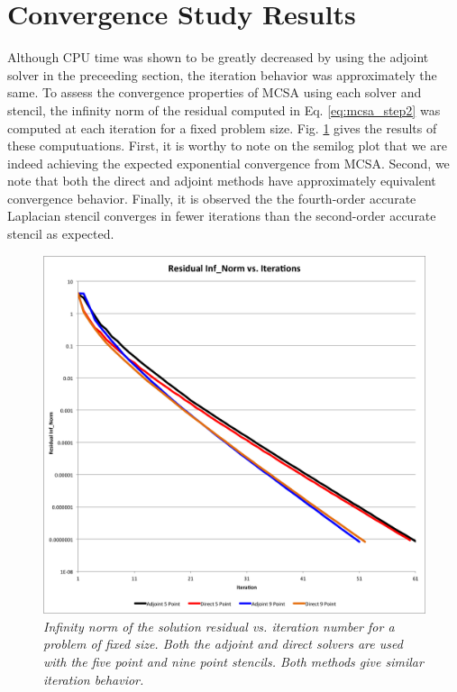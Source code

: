 \documentclass[note]{TechNote}
\begin{document}
\section{Convergence Study Results}
Although CPU time was shown to be greatly decreased by using the
adjoint solver in the preceeding section, the iteration behavior was
approximately the same. To assess the convergence properties of MCSA
using each solver and stencil, the infinity norm of the residual
computed in Eq. \ref{eq:mcsa_step2} was computed at each iteration for
a fixed problem size. Fig. \ref{fig:convergence} gives the results of
these computuations. First, it is worthy to note on the semilog plot
that we are indeed achieving the expected exponential convergence from
MCSA. Second, we note that both the direct and adjoint methods have
approximately equivalent convergence behavior. Finally, it is observed
the the fourth-order accurate Laplacian stencil converges in fewer
iterations than the second-order accurate stencil as expected.

\begin{figure}[htpb!]
  \centering
  \includegraphics[width=5in]{AdjointDirectConvergence.png}
  \caption{\sl Infinity norm of the solution residual vs. iteration
    number for a problem of fixed size. Both the adjoint and direct
    solvers are used with the five point and nine point stencils. Both
    methods give similar iteration behavior.}
  \label{fig:convergence}
\end{figure}
\end{document}
